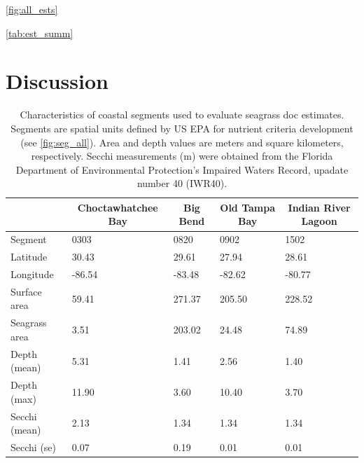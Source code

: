 \documentclass[letterpaper,12pt,oneside]{article}\usepackage[]{graphicx}\usepackage[]{color}
\begin{document}
\cref{fig:all_ests}

\cref{tab:est_summ}

\section{Discussion}


\clearpage
\begin{singlespace}


\end{singlespace}
\clearpage


\begin{table}[!tbp]
\caption{Characteristics of coastal segments used to evaluate seagrass \acl{doc} estimates.  Segments are spatial units defined by US \ac{EPA} for nutrient criteria development (see \cref{fig:seg_all}).  Area and depth values are meters and square kilometers, respectively.  Secchi measurements (m) were obtained from the Florida Department of Environmental Protection's Impaired Waters Record, upadate number 40 (IWR40).\label{tab:seg_summ}} 
\begin{center}
\begin{tabular}{lllll}
\hline\hline
\multicolumn{1}{l}{}&\multicolumn{1}{c}{Choctawhatchee Bay}&\multicolumn{1}{c}{Big Bend}&\multicolumn{1}{c}{Old Tampa Bay}&\multicolumn{1}{c}{Indian River Lagoon}\tabularnewline
\hline
Segment&0303&0820&0902&1502\tabularnewline
Latitude& 30.43& 29.61& 27.94& 28.61\tabularnewline
Longitude&-86.54&-83.48&-82.62&-80.77\tabularnewline
Surface area& 59.41&271.37&205.50&228.52\tabularnewline
Seagrass area&  3.51&203.02& 24.48& 74.89\tabularnewline
Depth (mean)&  5.31&  1.41&  2.56&  1.40\tabularnewline
Depth (max)& 11.90&  3.60& 10.40&  3.70\tabularnewline
Secchi (mean)&  2.13&  1.34&  1.34&  1.34\tabularnewline
Secchi (se)&  0.07&  0.19&  0.01&  0.01\tabularnewline
\hline
\end{tabular}\end{center}

\end{table}
\end{document}

